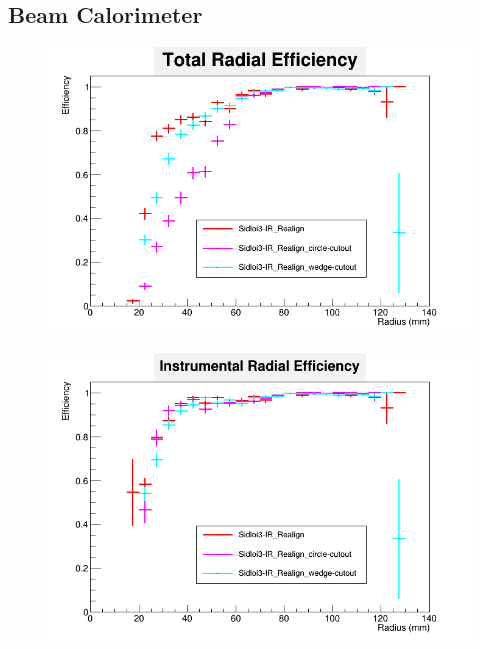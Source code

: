 \documentclass{report}
\begin{document}
            \subsection{Beam Calorimeter}
                \begin{figure}[H] 
                    \includegraphics[width=\textwidth]{RadialEfficiency_total_geom}
                    \centering
                    \caption{}
                    \label{geom_beamcal_total}
                \end{figure}
                \begin{figure}[H]
                    \includegraphics[width=\textwidth]{RadialEfficiency_instrumental_geom}
                    \centering
                    \caption{}
                    \label{geom_beamcal_inst}
                \end{figure}
\end{document}
